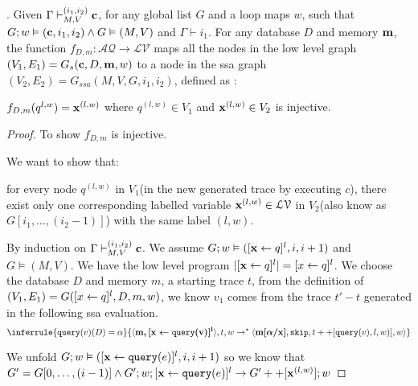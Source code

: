 \documentclass[a4paper,11pt]{article}
\begin{document}
\begin{lem}.
\label{lem:vertex}
Given $ \Gamma \vdash_{M,V}^{(i_1,i_2)} \boldsymbol{\mathbf{c}}$, for any global list $G$ and a loop maps $w$, such that $G ;w \vDash (\boldsymbol{\mathbf{c}}, i_1, i_2) \land G \vDash (M,V)$ and $\Gamma \vdash i_1$. For any database $D$ and memory $\boldsymbol{\mathbf{m}}$, the function $f_{D,m}: \mathcal{AQ} \to \mathcal{LV}$ maps all the nodes in the low level graph $(V_1, E_1) = G_{s}(\boldsymbol{\mathbf{c}}, D, \boldsymbol{\mathbf{m}},w)$ to a node in the ssa graph $(V_2,E_2) = G_{ssa}(M,V,G,i_1,i_2)$, defined as :

$f_{D,m}(q^{l,w}) = \boldsymbol{\mathbf{x}}^{(l,w)}$ where $q^{(l,w)} \in V_1 $ and $\boldsymbol{\mathbf{x}}^{(l,w)} \in V_2$ is injective.
\end{lem}
%
\begin{proof}
 To show $f_{D,m}$ is injective.
 
 We want to show that:
 
 for every node $q^{(l,w)}$ in $V_1$(in the new generated trace by executing $c$), there exist only one corresponding labelled variable $\boldsymbol{\mathbf{x}}^{(l,w)} \in \mathcal{LV}$ in $V_2$(also know as $G[i_1,\ldots, (i_2-1)]$) with the same label $(l, w)$. 

By induction on $ \Gamma \vdash_{M,V}^{(i_1,i_2)} \boldsymbol{\mathbf{c}}$.
  We assume $G;w \vDash ( [ \mathrel{ \boldsymbol{\mathbf{x}} \leftarrow q }]^{l} , i, i+1 )$ and $G \vDash (M,V)$. We have the low level program $|[ \mathrel{ \boldsymbol{\mathbf{x}} \leftarrow q }]^{l} | = [\mathrel{ x \leftarrow q }]^{l}$. We choose the database $D$ and memory $m$, a starting trace $t$, 
  from the definition of $(V_1,E_1)= G( [\mathrel{ x \leftarrow q }]^{l} , D,m,w)$, we know $v_1$ comes from the trace $t' -t$ generated in the following ssa evaluation.
   \[ 
    \inferrule{
     \query(v)(D) = \qval
    }{
   \config{\ssa{m, [\assign{x}{\query(v)}]^{l}}}, t, w  \to^{*} \config{\ssa{m[\qval/x]},\eskip, t++[\query(v),l,w)], w} } \]
 
   We unfold $G; w \vDash ( [\mathrel{ \boldsymbol{\mathbf{x}} \leftarrow {\tt query}(e) }]^{l}, i, i+1) $ so we know that 
   $G' = G[0, \ldots, (i-1)] \land G';w; [\mathrel{ \boldsymbol{\mathbf{x}} \leftarrow {\tt query}(e) }]^{l} \to G' ++ [\boldsymbol{\mathbf{x}}^{(l,w)}]; w$
  

\end{proof}
\end{document}
